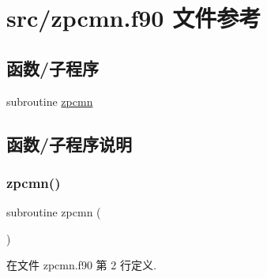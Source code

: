 \hypertarget{zpcmn_8f90}{}\section{src/zpcmn.f90 文件参考}
\label{zpcmn_8f90}
\subsection*{函数/子程序}
\begin{DoxyCompactItemize}
\item 
subroutine \mbox{\hyperlink{zpcmn_8f90_a8e53cb28d6b97d8a476ef72f6da13770}{zpcmn}}
\end{DoxyCompactItemize}


\subsection{函数/子程序说明}
\mbox{\label{zpcmn_8f90_a8e53cb28d6b97d8a476ef72f6da13770}} 
\subsubsection{\texorpdfstring{zpcmn()}{zpcmn()}}
{\footnotesize\ttfamily subroutine zpcmn (\begin{DoxyParamCaption}{ }\end{DoxyParamCaption})}



在文件 zpcmn.\+f90 第 2 行定义.

